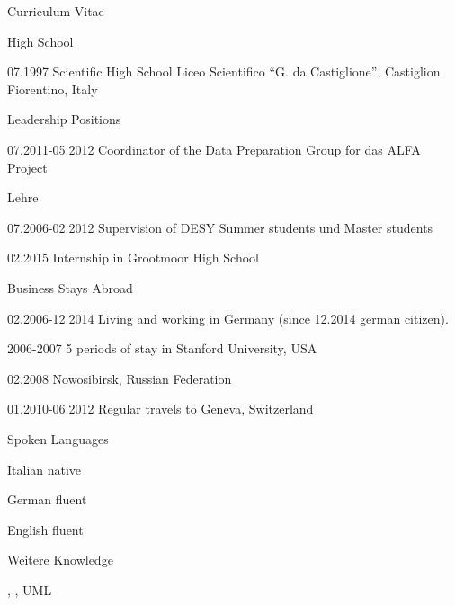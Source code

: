 \documentclass[11pt,a4paper]{scrartcl}
\newcommand{\versal}[1]{\textsf{\textsmaller{\MakeUppercase{\caps{#1}}}}\xspace}
\newcommand*{\ac}[1]{\versal{#1}}
\begin{document}
\begin{cv}{Curriculum Vitae}
\begin{cvlist}{High School}
\item[07.1997] Scientific High School Liceo Scientifico "`G. da
Castiglione"', Castiglion Fiorentino, Italy
\end{cvlist}

\begin{cvlist}{Leadership Positions}
\item [07.2011-05.2012] Coordinator of the Data Preparation Group for das ALFA
Project
\end{cvlist}

\begin{cvlist}{Lehre}
\item [07.2006-02.2012] Supervision of DESY Summer students und
Master students
\item [02.2015] Internship in Grootmoor High School
\end{cvlist}

\begin{cvlist}{Business Stays Abroad}
\item [02.2006-12.2014] Living and working in Germany (since 12.2014 german
citizen).
\item [2006-2007] 5 periods of stay in Stanford University, USA
\item [02.2008] Nowosibirsk, Russian Federation
\item [01.2010-06.2012] Regular travels to Geneva, Switzerland
\end{cvlist}

\begin{cvlist}{Spoken Languages}
\item [Italian] native
\item [German] fluent
\item [English] fluent
\end{cvlist}

\begin{cvlist}{Weitere \ac{EDV} Knowledge}
\item[] \ac{MS OFFICE}, \ac{\LaTeX}, UML
\end{cvlist}


\end{cv}
\end{document}

